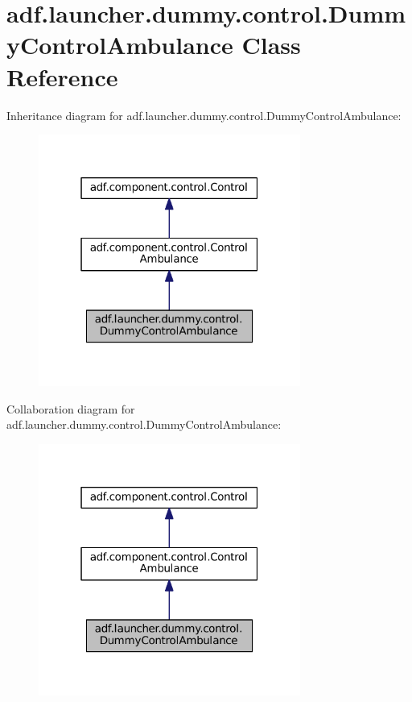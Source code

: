\hypertarget{classadf_1_1launcher_1_1dummy_1_1control_1_1DummyControlAmbulance}{}\section{adf.\+launcher.\+dummy.\+control.\+Dummy\+Control\+Ambulance Class Reference}
\label{classadf_1_1launcher_1_1dummy_1_1control_1_1DummyControlAmbulance}


Inheritance diagram for adf.\+launcher.\+dummy.\+control.\+Dummy\+Control\+Ambulance\+:
\nopagebreak
\begin{figure}[H]
\begin{center}
\leavevmode
\includegraphics[width=244pt]{classadf_1_1launcher_1_1dummy_1_1control_1_1DummyControlAmbulance__inherit__graph}
\end{center}
\end{figure}


Collaboration diagram for adf.\+launcher.\+dummy.\+control.\+Dummy\+Control\+Ambulance\+:
\nopagebreak
\begin{figure}[H]
\begin{center}
\leavevmode
\includegraphics[width=244pt]{classadf_1_1launcher_1_1dummy_1_1control_1_1DummyControlAmbulance__coll__graph}
\end{center}
\end{figure}
